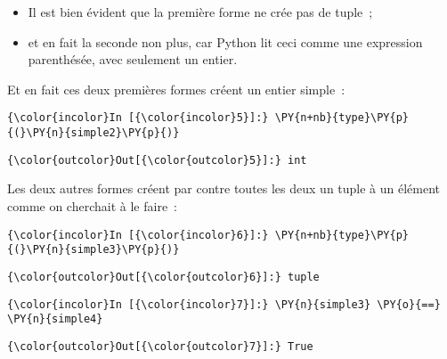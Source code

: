     \begin{itemize}
\tightlist
\item
  Il est bien évident que la première forme ne crée pas de tuple~;
\item
  et en fait la seconde non plus, car Python lit ceci comme une
  expression parenthésée, avec seulement un entier.
\end{itemize}

Et en fait ces deux premières formes créent un entier simple~:

    \begin{Verbatim}[commandchars=\\\{\},frame=single,framerule=0.3mm,rulecolor=\color{cellframecolor}]
{\color{incolor}In [{\color{incolor}5}]:} \PY{n+nb}{type}\PY{p}{(}\PY{n}{simple2}\PY{p}{)}
\end{Verbatim}


\begin{Verbatim}[commandchars=\\\{\},frame=single,framerule=0.3mm,rulecolor=\color{cellframecolor}]
{\color{outcolor}Out[{\color{outcolor}5}]:} int
\end{Verbatim}
            
    Les deux autres formes créent par contre toutes les deux un tuple à un
élément comme on cherchait à le faire~:

    \begin{Verbatim}[commandchars=\\\{\},frame=single,framerule=0.3mm,rulecolor=\color{cellframecolor}]
{\color{incolor}In [{\color{incolor}6}]:} \PY{n+nb}{type}\PY{p}{(}\PY{n}{simple3}\PY{p}{)}
\end{Verbatim}


\begin{Verbatim}[commandchars=\\\{\},frame=single,framerule=0.3mm,rulecolor=\color{cellframecolor}]
{\color{outcolor}Out[{\color{outcolor}6}]:} tuple
\end{Verbatim}
            
    \begin{Verbatim}[commandchars=\\\{\},frame=single,framerule=0.3mm,rulecolor=\color{cellframecolor}]
{\color{incolor}In [{\color{incolor}7}]:} \PY{n}{simple3} \PY{o}{==} \PY{n}{simple4}
\end{Verbatim}


\begin{Verbatim}[commandchars=\\\{\},frame=single,framerule=0.3mm,rulecolor=\color{cellframecolor}]
{\color{outcolor}Out[{\color{outcolor}7}]:} True
\end{Verbatim}
            
